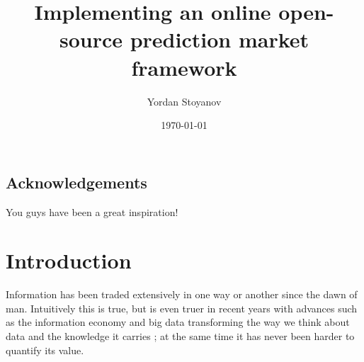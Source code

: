 \documentclass[bsc,frontabs,twoside,singlespacing,parskip,deptreport]{infthesis}     %
\begin{document}
\title{Implementing an online open-source prediction market framework}

\author{Yordan Stoyanov}



\date{\today}


\maketitle

\section*{Acknowledgements}
You guys have been a great inspiration!

\tableofcontents



\chapter{Introduction}

	Information has been traded extensively in one way or another since the dawn of man. Intuitively this is true, but is even truer in recent years with advances such as the information economy and big data transforming the way we think about data and the knowledge it carries \cite{mcgee_managing_1993}; at the same time it has never been harder to quantify its value. 
	
\end{document}
